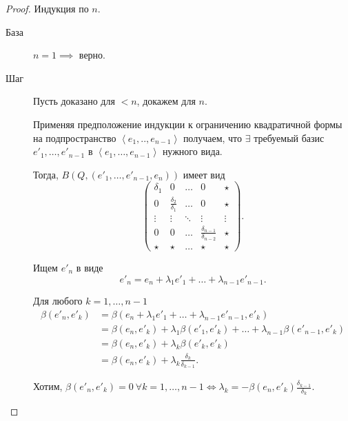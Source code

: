 \begin{proof}
    Индукция по $n$.

    \begin{description}
    \item[База] $n = 1 \implies $ верно.
    \item[Шаг] Пусть доказано для $< n$, докажем для $n$.

        Применяя предположение индукции к ограничению квадратичной формы на подпространство $\left< e_1, .., e_{n - 1} \right>$ получаем, что $\exists$ требуемый базис $e'_1, \dots, e'_{n - 1}$ в $\left< e_1, \dots, e_{n - 1} \right>$ нужного вида.

        Тогда, $B(Q, (e'_1, \dots, e'_{n - 1}, e_n))$ имеет вид 
        \begin{equation*}
            \left(\begin{array}{cccc|c}
                \delta_1 & 0 & \dots & 0 & \star \\
                0 & \frac{\delta_2}{\delta_1} & \dots & 0 & \star \\
                \vdots & \vdots & \ddots & \vdots & \vdots \\
                0 & 0 & \dots & \frac{\delta_{n - 1}}{\delta_{n - 2}} & \star \\
                \hline
                \star & \star & \dots & \star & \star
            \end{array}\right)
        .\end{equation*}

        Ищем $e'_n$ в виде
        \begin{equation*}
            e'_n = e_n + \lambda_1 e'_1 + \dots + \lambda_{n - 1} e'_{n - 1}
        .\end{equation*}

        Для любого $k = 1, \dots, n - 1$
        \begin{align*}
            \beta(e'_n, e'_k) &= \beta(e_n + \lambda_1 e'_1 + \dots + \lambda_{n - 1} e'_{n - 1}, e'_k) \\
            &= \beta(e_n, e'_k) + \lambda_1 \beta(e'_1, e'_k) + \dots + \lambda_{n - 1} \beta(e'_{n - 1}, e'_k) \\
            &= \beta(e_n, e'_k) + \lambda_k \beta(e'_k, e'_k) \\
            &= \beta(e_n, e'_k) + \lambda_k \frac{\delta_k}{\delta_{k - 1}}
        .\end{align*}

        Хотим, $\beta(e'_n, e'_k) = 0 \ \forall k = 1, \dots, n - 1 \iff \lambda_k = -\beta(e_n, e'_k) \frac{\delta_{k - 1}}{\delta_k}$.


\end{description}
\end{proof}
